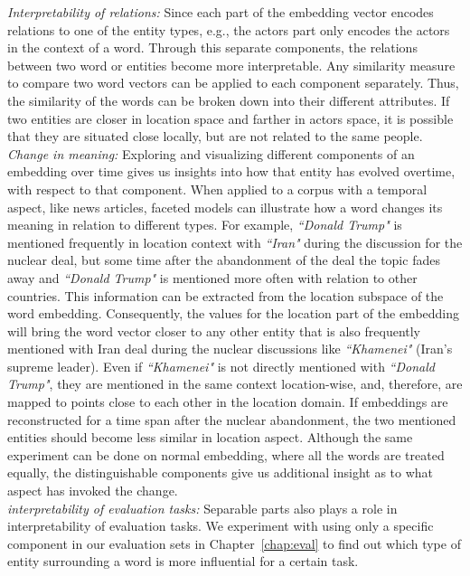\emph{Interpretability of relations:} Since each part of the embedding vector encodes relations to one of the entity types, e.g., the actors part only encodes the actors in the context of a word. Through this separate components, the relations between two word or entities become more interpretable. Any similarity measure to compare two word vectors can be applied to each component separately. Thus, the similarity of the words can be broken down into their different attributes. If two entities are closer in location space and farther in actors space, it is possible that they are situated close locally, but are not related to the same people. \\
 \emph{Change in meaning:} Exploring and visualizing different components of an embedding over time gives us insights into how that entity has evolved overtime, with respect to that component. When applied to a corpus with a temporal aspect, like news articles, faceted models can illustrate how a word changes its meaning in relation to different types. For example, \emph{``Donald Trump"} is mentioned frequently in location context with \emph{``Iran"} during the discussion for the nuclear deal, but some time after the abandonment of the deal the topic fades away and \emph{``Donald Trump"}  is mentioned more often with relation to other countries. This information can be extracted from the location subspace of the word embedding. Consequently, the values for the location part of the embedding will bring the word vector closer to any other entity that is also frequently mentioned with Iran deal during the nuclear discussions like \emph{``Khamenei"} (Iran's supreme leader). Even if \emph{``Khamenei"} is not directly mentioned with \emph{``Donald Trump"}, they are mentioned in the same context location-wise, and, therefore, are mapped to points close to each other in the location domain. If embeddings are reconstructed for a time span after the nuclear abandonment, the two mentioned entities should become less similar in location aspect. Although the same experiment can be done on normal embedding, where all the words are treated equally, the distinguishable components give us additional insight as to what aspect has invoked the change.\\

\emph{interpretability of evaluation tasks:} Separable parts also plays a role in interpretability of evaluation tasks. We experiment with using only a specific component in our evaluation sets in Chapter~\ref{chap:eval} to find out which type of entity surrounding a word is more influential for a certain task.\\

